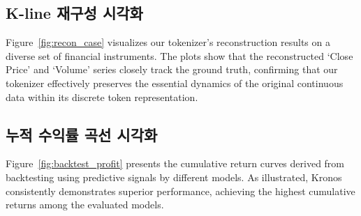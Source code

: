 \subsection{K-line 재구성 시각화}

Figure~\ref{fig:recon_case} visualizes our tokenizer's reconstruction results on a diverse set of financial instruments. The plots show that the reconstructed `Close Price' and `Volume' series closely track the ground truth, confirming that our tokenizer effectively preserves the essential dynamics of the original continuous data within its discrete token representation.

\subsection{누적 수익률 곡선 시각화}

Figure~\ref{fig:backtest_profit} presents the cumulative return curves derived from backtesting using predictive signals by different models. As illustrated, Kronos consistently demonstrates superior performance, achieving the highest cumulative returns among the evaluated models.

